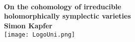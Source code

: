 \documentclass[11pt,twoside]{article}
\begin{document}
\thispagestyle{empty}
\begin{center}
\ \\
\ \\
\ \\
\textbf{\huge On the cohomology of irreducible\\holomorphically symplectic varieties}
\\
\vspace{15mm}
\textbf{\LARGE Simon Kapfer}\\
\vspace{80mm}
\texttt{[image: LogoUni.png]}
\end{center}
\end{document}
